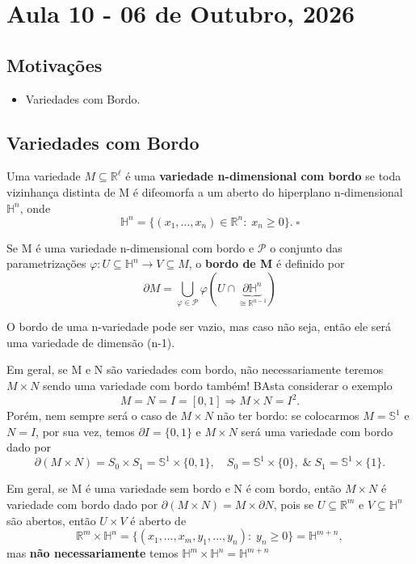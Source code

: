 \documentclass[../differential_topology.tex]{subfiles}
\begin{document}
\section{Aula 10 - 06 de Outubro, 2026}
\subsection{Motivações}
\begin{itemize}
	\item Variedades com Bordo.
\end{itemize}
\subsection{Variedades com Bordo}
\begin{def*}
	Uma variedade \(M\subseteq \mathbb{R}^{\ell }\) é uma \textbf{variedade n-dimensional com bordo} se toda vizinhança distinta de M é difeomorfa a um aberto do hiperplano n-dimensional \(\mathbb{H}^{n}\), onde
	\[
		\mathbb{H}^{n} =\{(x_1, \dotsc , x_{n})\in \mathbb{R}^{n}:\; x_{n}\geq 0\}.\; \square
	\]
\end{def*}
\begin{def*}
	Se M é uma variedade n-dimensional com bordo e \(\mathcal{P}\) o conjunto das parametrizações \(\varphi :U\subseteq \mathbb{H}^{n}\rightarrow V\subseteq M\), o \textbf{bordo de M} é definido por
	\[
		\partial M = \bigcup_{\varphi\in \mathcal{P} }^{}\varphi (U\cap \underbrace{\partial \mathbb{H}^{n}}_{\cong \mathbb{R}^{n-1}})
	\]
\end{def*}

O bordo de uma n-variedade pode ser vazio, mas caso não seja, então ele será uma variedade de dimensão (n-1).
\begin{tcolorbox}[
		skin=enhanced,
		title=Observação,
		fonttitle=\bfseries,
		colframe=black,
		colbacktitle=cyan!75!white,
		colback=cyan!15,
		colbacklower=black,
		coltitle=black,
		drop fuzzy shadow,
	]
	Em geral, se M e N são variedades com bordo, não necessariamente teremos \(M\times N\) sendo uma variedade com bordo também! BAsta considerar o exemplo
	\[
		M = N = I = [0, 1] \Rightarrow M\times N = I^{2}.
	\]
	Porém, nem sempre será o caso de \(M\times N\) não ter bordo: se colocarmos \(M = \mathbb{S}^{1}\) e \(N=I\), por sua vez, temos \(\partial I = \{0, 1\}\) e \(M\times N\) será uma variedade com bordo dado por
	\[
		\partial (M\times N) = S_{0} \times S_{1} = \mathbb{S}^{1} \times \{0, 1\}, \quad S_{0} = \mathbb{S}^{1}\times \{0\},\;\&\; S_{1} = \mathbb{S}^{1}\times \{1\}.
	\]

	Em geral, se M é uma variedade sem bordo e N é com bordo, então \(M\times N\) é variedade com bordo dado por \(\partial (M\times N) = M\times \partial N\), pois se \(U\subseteq \mathbb{R}^{m}\) e \(V\subseteq \mathbb{H}^{n}\) são abertos, então \(U\times V\) é aberto de
	\[
		\mathbb{R}^{m}\times \mathbb{H}^{n} = \{(x_1, \dotsc , x_{m}, y_1, \dotsc , y_{n}):\; y_{n}\geq 0\} = \mathbb{H}^{m+n},
	\]
	mas \textbf{não necessariamente} temos \(\mathbb{H}^{m}\times \mathbb{H}^{n} = \mathbb{H}^{m+n}\)
\end{tcolorbox}
\end{document}

